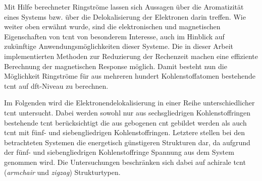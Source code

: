 Mit Hilfe berechneter Ringströme lassen sich Aussagen über die Aromatizität eines Systems bzw. über die Delokalisierung der Elektronen darin treffen. Wie weiter oben erwähnt wurde,  sind die elektronischen und magnetischen Eigenschaften von \ac{tcnt} von besonderem Interesse, auch im Hinblick auf zukünftige Anwendungsmöglichkeiten dieser Systeme. Die in dieser Arbeit implementierten Methoden zur Reduzierung der Rechenzeit machen eine effiziente Berechnung der magnetischen Response möglich. Damit besteht nun die Möglichkeit Ringströme für aus mehreren hundert Kohlenstoffatomen bestehende \ac{tcnt} auf \ac{dft}-Niveau zu berechnen.

 Im Folgenden wird die Elektronendelokalisierung in einer Reihe unterschiedlicher \ac{tcnt} untersucht. Dabei werden sowohl nur aus sechsgliedrigen Kohlenstoffringen bestehende \ac{tcnt} berücksichtigt die aus gebogenen \ac{cnt} gebildet werden als auch \ac{tcnt} mit fünf- und siebengliedrigen Kohlenstoffringen. Letztere stellen bei den betrachteten Systemen die energetisch günstigeren Strukturen dar, da aufgrund der fünf- und siebengliedrigen Kohlenstoffringe Spannung aus dem System genommen wird. Die Untersuchungen beschränken sich dabei auf achirale \ac{tcnt} (\textit{armchair} und \textit{zigzag}) Strukturtypen. 

